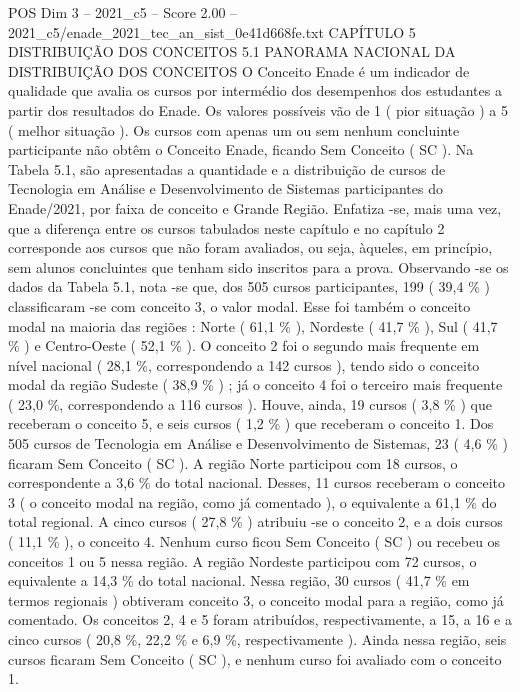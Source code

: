 \begin{textsample}{POS Dim 3 – 2021\_c5 – Score 2.00 – 2021\_c5/enade\_2021\_tec\_an\_sist\_0e41d668fe.txt}  \label{ex:f3_pos_090}
CAPÍTULO 5 DISTRIBUIÇÃO DOS CONCEITOS 5.1 PANORAMA NACIONAL DA DISTRIBUIÇÃO DOS CONCEITOS O Conceito Enade é um indicador de qualidade que avalia os cursos por intermédio dos desempenhos dos estudantes a partir dos resultados do Enade.
Os valores possíveis vão de 1 ( pior situação ) a 5 ( melhor situação ).
Os cursos com apenas um ou sem nenhum concluinte participante não obtêm o Conceito Enade, ficando Sem Conceito ( SC ).
Na Tabela 5.1, são apresentadas a quantidade e a distribuição de cursos de Tecnologia em Análise e Desenvolvimento de Sistemas participantes do Enade/2021, por faixa de conceito e Grande Região.
Enfatiza -se, mais uma vez, que a diferença entre os cursos tabulados neste capítulo e no capítulo 2 corresponde aos cursos que não foram avaliados, ou seja, àqueles, em princípio, sem alunos concluintes que tenham sido inscritos para a prova.
Observando -se os dados da Tabela 5.1, nota -se que, dos 505 cursos participantes, 199 ( 39,4 \% ) classificaram -se com conceito 3, o valor modal.
Esse foi também o conceito modal na maioria das regiões : Norte ( 61,1 \% ), Nordeste ( 41,7 \% ), Sul ( 41,7 \% ) e Centro-Oeste ( 52,1 \% ).
O conceito 2 foi o segundo mais frequente em nível nacional ( 28,1 \%, correspondendo a 142 cursos ), tendo sido o conceito modal da região Sudeste ( 38,9 \% ) ; já o conceito 4 foi o terceiro mais frequente ( 23,0 \%, correspondendo a 116 cursos ).
Houve, ainda, 19 cursos ( 3,8 \% ) que receberam o conceito 5, e seis cursos ( 1,2 \% ) que receberam o conceito 1.
Dos 505 cursos de Tecnologia em Análise e Desenvolvimento de Sistemas, 23 ( 4,6 \% ) ficaram Sem Conceito ( SC ).
A região Norte participou com 18 cursos, o correspondente a 3,6 \% do total nacional.
Desses, 11 cursos receberam o conceito 3 ( o conceito modal na região, como já comentado ), o equivalente a 61,1 \% do total regional.
A cinco cursos ( 27,8 \% ) atribuiu -se o conceito 2, e a dois cursos ( 11,1 \% ), o conceito 4.
Nenhum curso ficou Sem Conceito ( SC ) ou recebeu os conceitos 1 ou 5 nessa região.
A região Nordeste participou com 72 cursos, o equivalente a 14,3 \% do total nacional.
Nessa região, 30 cursos ( 41,7 \% em termos regionais ) obtiveram conceito 3, o conceito modal para a região, como já comentado.
Os conceitos 2, 4 e 5 foram atribuídos, respectivamente, a 15, a 16 e a cinco cursos ( 20,8 \%, 22,2 \% e 6,9 \%, respectivamente ).
Ainda nessa região, seis cursos ficaram Sem Conceito ( SC ), e nenhum curso foi avaliado com o conceito 1.

\end{textsample}
